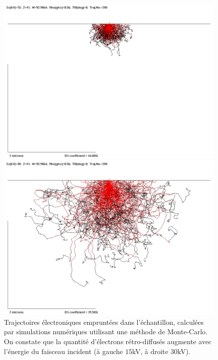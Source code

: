 \documentclass[a4paper,12pt]{article}
\begin{document}
\begin{figure}
\begin{minipage}[c]{.55\linewidth}
\centering
\includegraphics[width = 1 \textwidth]{images/mt_15kv.png}
\end{minipage}
\begin{minipage}[c]{.55\linewidth}
\includegraphics[width = 1 \textwidth]{images/mt_30kv.png}
\end{minipage}
\caption{Trajectoires électroniques empruntées dans l'échantillon, calculées par simulations numériques utilisant une méthode de Monte-Carlo. On constate que la quantité d'électrons rétro-diffusés augmente avec l'énergie du faisceau incident (à gauche $15$kV, à droite $30$kV).}
\label{fig:montecarlo}
\end{figure}
\end{document}
